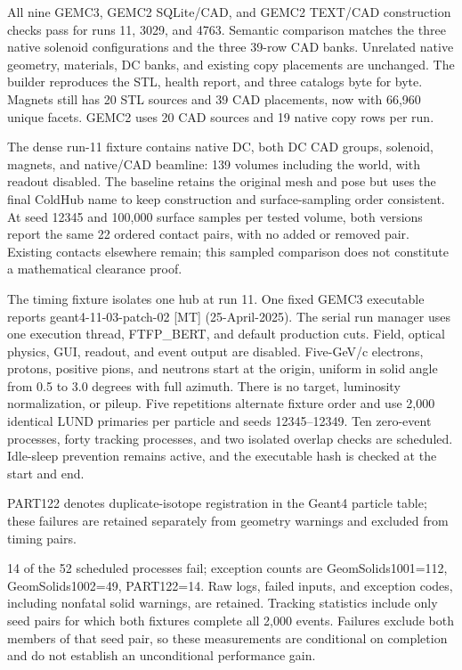 All nine GEMC3, GEMC2 SQLite/CAD, and GEMC2 TEXT/CAD construction checks pass for runs 11, 3029, and 4763.
Semantic comparison matches the three native solenoid configurations and the three 39-row CAD banks. Unrelated
native geometry, materials, DC banks, and existing copy placements are unchanged. The builder reproduces the
STL, health report, and three catalogs byte for byte. Magnets still has 20 STL sources and 39 CAD placements,
now with 66,960 unique facets. GEMC2 uses 20 CAD sources and 19 native copy rows per run.

The dense run-11 fixture contains native DC, both DC CAD groups, solenoid, magnets, and native/CAD beamline:
139 volumes including the world, with readout disabled. The baseline retains the original mesh and pose but
uses the final ColdHub name to keep construction and surface-sampling order consistent. At seed 12345 and
100,000 surface samples per tested volume, both versions report the same 22 ordered contact pairs, with no
added or removed pair. Existing contacts elsewhere remain; this sampled comparison does not constitute a
mathematical clearance proof.

The timing fixture isolates one hub at run 11. One fixed GEMC3 executable reports geant4-11-03-patch-02 [MT]
(25-April-2025). The serial run manager uses one execution thread, FTFP\_BERT, and default production cuts.
Field, optical physics, GUI, readout, and event output are disabled. Five-GeV/c electrons, protons, positive
pions, and neutrons start at the origin, uniform in solid angle from 0.5 to 3.0 degrees with full azimuth.
There is no target, luminosity normalization, or pileup. Five repetitions alternate fixture order and use
2,000 identical LUND primaries per particle and seeds 12345--12349. Ten zero-event processes, forty tracking
processes, and two isolated overlap checks are scheduled. Idle-sleep prevention remains active, and the
executable hash is checked at the start and end.

PART122 denotes duplicate-isotope registration in the Geant4 particle table; these failures are retained
separately from geometry warnings and excluded from timing pairs.

14 of the 52 scheduled processes fail; exception counts are GeomSolids1001=112, GeomSolids1002=49, PART122=14.
Raw logs, failed inputs, and exception codes, including nonfatal solid warnings, are retained. Tracking
statistics include only seed pairs for which both fixtures complete all 2,000 events. Failures exclude both
members of that seed pair, so these measurements are conditional on completion and do not establish an
unconditional performance gain.

